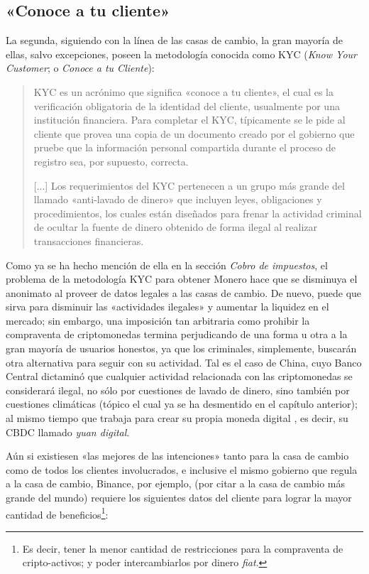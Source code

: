\documentclass[12pt,a4paper,twoside]{book}
\begin{document}
\subsection{«Conoce a tu cliente»}
La segunda, siguiendo con la línea de las casas de cambio, la gran mayoría de ellas, salvo excepciones, poseen la metodología conocida como KYC (\textit{Know Your Customer}; o \textit{Conoce a tu Cliente}):

\begin{quotation}
KYC es un acrónimo que significa «conoce a tu cliente», el cual es la verificación obligatoria de la identidad del cliente, usualmente por una institución financiera. Para completar el KYC, típicamente se le pide al cliente que provea una copia de un documento creado por el gobierno que pruebe que la información personal compartida durante el proceso de registro sea, por supuesto, correcta.

[...] Los requerimientos del KYC pertenecen a un grupo más grande del llamado «anti-lavado de dinero» que incluyen leyes, obligaciones y procedimientos, los cuales están diseñados para frenar la actividad criminal de ocultar la fuente de dinero obtenido de forma ilegal al realizar transacciones financieras. \cite{binance:kyc}
\end{quotation}

Como ya se ha hecho mención de ella en la sección \textit{Cobro de impuestos}, el problema de la metodología KYC para obtener Monero hace que se disminuya el anonimato al proveer de datos legales a las casas de cambio. De nuevo, puede que sirva para disminuir las «actividades ilegales» y aumentar la liquidez en el mercado; sin embargo, una imposición tan arbitraria como prohibir la compraventa de criptomonedas termina perjudicando de una forma u otra a la gran mayoría de usuarios honestos, ya que los criminales, simplemente, buscarán otra alternativa para seguir con su actividad. Tal es el caso de China, cuyo Banco Central dictaminó que cualquier actividad relacionada con las criptomonedas se considerará ilegal, no sólo por cuestiones de lavado de dinero, sino también por cuestiones climáticas (tópico el cual ya se ha desmentido en el capítulo anterior); al mismo tiempo que trabaja para crear su propia moneda digital \cite{bitcoin:china-ban}, es decir, su CBDC llamado \textit{yuan digital}.

Aún si existiesen «las mejores de las intenciones» tanto para la casa de cambio como de todos los clientes involucrados, e inclusive el mismo gobierno que regula a la casa de cambio, Binance, por ejemplo, (por citar a la casa de cambio más grande del mundo) requiere los siguientes datos del cliente para lograr la mayor cantidad de beneficios\footnote{Es decir, tener la menor cantidad de restricciones para la compraventa de cripto-activos; y poder intercambiarlos por dinero \textit{fiat}.}:
\end{document}
